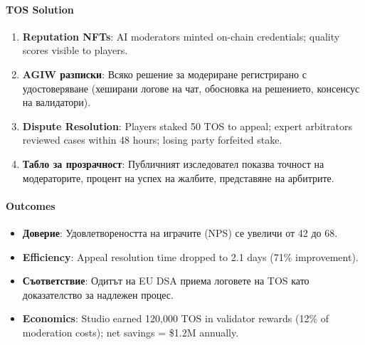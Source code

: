 \documentclass[11pt]{article}
\begin{document}
\paragraph{TOS Solution}
\begin{enumerate}[noitemsep]
  \item \textbf{Reputation NFTs}: AI moderators minted on-chain credentials; quality scores visible to players.
  \item \textbf{AGIW разписки}: Всяко решение за модериране регистрирано с удостоверяване (хеширани логове на чат, обосновка на решението, консенсус на валидатори).
  \item \textbf{Dispute Resolution}: Players staked 50 TOS to appeal; expert arbitrators reviewed cases within 48 hours; losing party forfeited stake.
  \item \textbf{Табло за прозрачност}: Публичният изследовател показва точност на модераторите, процент на успех на жалбите, представяне на арбитрите.
\end{enumerate}

\paragraph{Outcomes}
\begin{itemize}[noitemsep]
  \item \textbf{Доверие}: Удовлетвореността на играчите (NPS) се увеличи от 42 до 68.
  \item \textbf{Efficiency}: Appeal resolution time dropped to 2.1 days (71\% improvement).
  \item \textbf{Съответствие}: Одитът на EU DSA приема логовете на TOS като доказателство за надлежен процес.
  \item \textbf{Economics}: Studio earned 120,000 TOS in validator rewards (12\% of moderation costs); net savings = \$1.2M annually.
\end{itemize}
\end{document}
